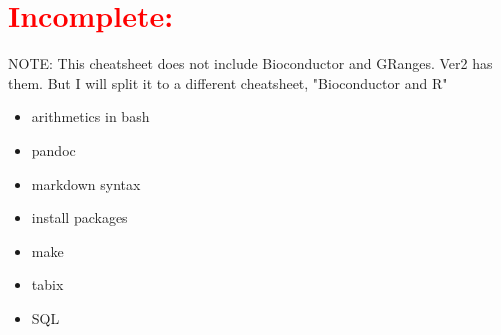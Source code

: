 \section{\textcolor{red}{\textbf{Incomplete:}}}

\begin{mdframed}[backgroundcolor=gray!20]
NOTE: This cheatsheet does not include Bioconductor and GRanges. Ver2 has them. But I will split it to a different cheatsheet, "Bioconductor and R"
\end{mdframed}

\begin{itemize}
\item arithmetics in bash\\
\item pandoc\\
\item markdown syntax\\
\item install packages\\
\item make\\
\item tabix\\
\item SQL
\end{itemize}

